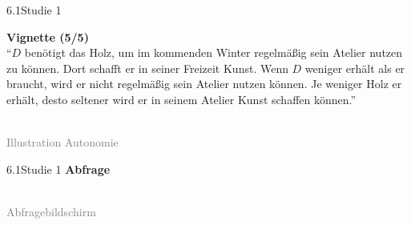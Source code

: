 \documentclass[xcolor=table,9pt,aspectratio=169]{beamer}
\begin{document}
\begin{frame}{\vspace*{10mm}6.1\hspace*{1em}Studie 1}
\begin{multicols}{2}
   \textbf{Vignette (5/5)}\\
   \medskip
   \enquote{$D$ benötigt das Holz, um im kommenden Winter regelmäßig sein Atelier nutzen zu können. Dort schafft er in seiner Freizeit Kunst. Wenn $D$ weniger erhält als er braucht, wird er nicht regelmäßig sein Atelier nutzen können. Je weniger Holz er erhält, desto seltener wird er in seinem Atelier Kunst schaffen können.}
   \vfill
   \begin{center}
      \\
      \footnotesize{\textcolor{gray}{Illustration Autonomie}}
   \end{center}
\end{multicols}
\end{frame}


\begin{frame}{\vspace*{10mm}6.1\hspace*{1em}Studie 1}
\textbf{Abfrage}\\
\bigskip
\begin{center}
   \\
   \footnotesize{\textcolor{gray}{Abfragebildschirm}}
\end{center}
\end{frame}
\end{document}

